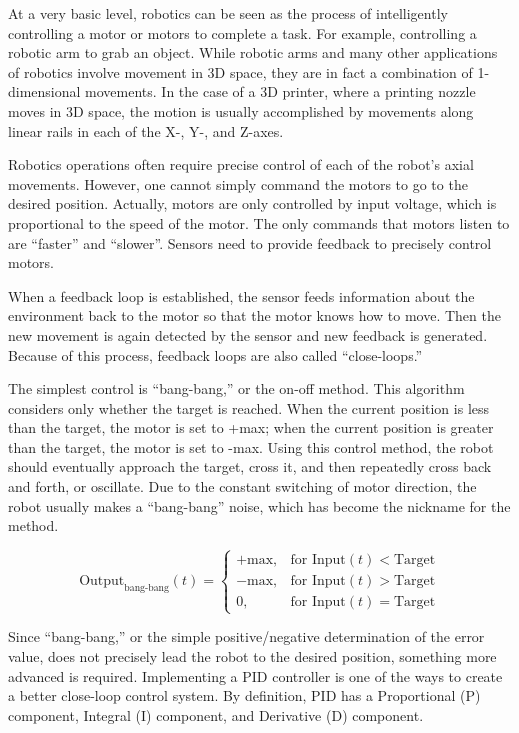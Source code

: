 
At a very basic level, robotics can be seen as the process of intelligently controlling a motor or motors to complete a task. For example, controlling a robotic arm to grab an object. While robotic arms and many other applications of robotics involve movement in 3D space, they are in fact a combination of 1-dimensional movements. In the case of a 3D printer, where a printing nozzle moves in 3D space, the motion is usually accomplished by movements along linear rails in each of the X-, Y-, and Z-axes.

Robotics operations often require precise control of each of the robot’s axial movements. However, one cannot simply command the motors to go to the desired position. Actually, motors are only controlled by input voltage, which is proportional to the speed of the motor. The only commands that motors listen to are “faster” and “slower”. Sensors need to provide feedback to precisely control motors.

When a feedback loop is established, the sensor feeds information about the environment back to the motor so that the motor knows how to move. Then the new movement is again detected by the sensor and new feedback is generated. Because of this process, feedback loops are also called “close-loops.”

The simplest control is “bang-bang,” or the on-off method. This algorithm considers only whether the target is reached. When the current position is less than the target, the motor is set to +max; when the current position is greater than the target, the motor is set to -max. Using this control method, the robot should eventually approach the target, cross it, and then repeatedly cross back and forth, or oscillate. Due to the constant switching of motor direction, the robot usually makes a “bang-bang” noise, which has become the nickname for the method.

\[ \text{Output}_{\text{bang-bang}}(t) = \begin{cases}
    +\text{max}, & \text{for Input}(t) < \text{Target} \\
    -\text{max}, & \text{for Input}(t) > \text{Target} \\
    0, & \text{for Input}(t) = \text{Target}
\end{cases} \]

Since “bang-bang,” or the simple positive/negative determination of the error value, does not precisely lead the robot to the desired position, something more advanced is required. Implementing a PID controller is one of the ways to create a better close-loop control system. By definition, PID has a Proportional (P) component, Integral (I) component, and Derivative (D) component.

